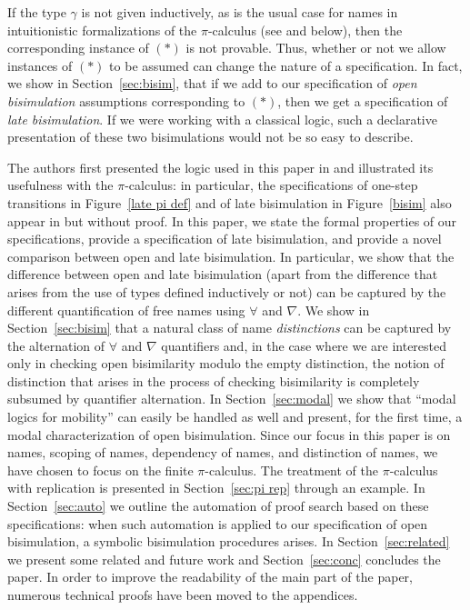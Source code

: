 \documentclass{acmtrans2m}
\begin{document}
If the type $\gamma$ is not given inductively, as is the usual case
for names in intuitionistic formalizations of the $\pi$-calculus (see
\cite{despeyroux00ifiptcs} and below), then
the corresponding instance of $(*)$ is not provable.
Thus, whether or not
we allow instances of $(*)$ to be assumed can change the nature
of a specification.  In fact, we show in Section~\ref{sec:bisim},
that if we add to our specification of {\em open bisimulation}
\cite{sangiorgi96acta} assumptions corresponding to $(*)$, then we get
a specification of {\em late bisimulation}.  If we were working with a
classical logic, such a declarative presentation of these two
bisimulations would not be so easy to describe.  

The authors first presented the logic used in this paper in
\cite{miller03lics} and illustrated its usefulness with the
$\pi$-calculus: in particular, the specifications of one-step
transitions in Figure~\ref{late pi def} and of late bisimulation in
Figure~\ref{bisim} also appear in \cite{miller03lics} but without
proof.  In this paper, we state the formal properties of our specifications,
provide a specification of late bisimulation, and provide a novel
comparison between open and late bisimulation.
In particular, we show that the difference between open and late
bisimulation (apart from the difference that arises from the use of
types defined inductively or not) can be captured by the different
quantification of free names using $\forall$ and $\nabla$.
We show in Section~\ref{sec:bisim} that a natural class of name {\em
distinctions} can be captured by the alternation of $\forall$ and
$\nabla$ quantifiers and, in the case where we are interested only in
checking open bisimilarity modulo the empty distinction, the notion of
distinction that arises in the process of checking bisimilarity is
completely subsumed by quantifier alternation.
In Section~\ref{sec:modal} we show that ``modal logics
for mobility'' can easily be handled as well and present, for the
first time, a modal characterization of open bisimulation.  Since our
focus in this paper is on names, scoping of names, dependency of
names, and distinction of names, we have chosen to focus on the finite
$\pi$-calculus.  The treatment of the $\pi$-calculus with replication is
presented in Section~\ref{sec:pi rep} through an example.  In
Section~\ref{sec:auto} we outline the automation of proof search based
on these specifications: when such automation is applied to our
specification of open bisimulation, a symbolic bisimulation
procedures arises.  In Section~\ref{sec:related} we present some related and
future work and Section~\ref{sec:conc} concludes the paper. 
In order to improve the readability of the main part of the paper, 
numerous technical proofs have been moved to the appendices.
\end{document}

